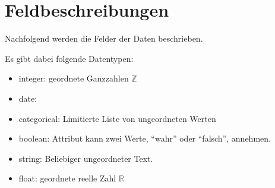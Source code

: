 
\appendix
\chapter{Feldbeschreibungen}
\label{app:feldbeschreibungen}
Nachfolgend werden die Felder der Daten beschrieben.

Es gibt dabei folgende Datentypen:
\begin{itemize}
\item integer: geordnete Ganzzahlen $\mathbb{Z}$
\item date: 
\item categorical: Limitierte Liste von ungeordneten Werten
\item boolean: Attribut kann zwei Werte, "`wahr"' oder "`falsch"', annehmen. 
\item string: Beliebiger ungeordneter Text.
\item float: geordnete reelle Zahl $\mathbb{R}$
\end{itemize}

